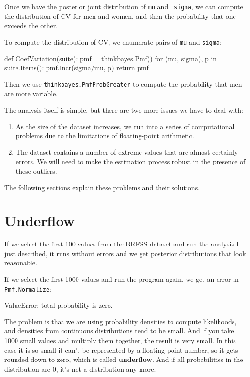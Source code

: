 \documentclass[12pt]{book}
\theoremstyle{exercise}
\begin{document}
Once we have the posterior joint distribution of {\tt mu} and {\tt
  sigma}, we can compute the distribution of CV for men and women, and
then the probability that one exceeds the other.

To compute the distribution of CV, we enumerate pairs of
{\tt mu} and {\tt sigma}:

\begin{code}
def CoefVariation(suite):
    pmf = thinkbayes.Pmf()
    for (mu, sigma), p in suite.Items():
        pmf.Incr(sigma/mu, p)
    return pmf
\end{code}

Then we use \verb"thinkbayes.PmfProbGreater" to compute the
probability that men are more variable.

The analysis itself is simple, but there are two more issues we
have to deal with:

\begin{enumerate}

\item As the size of the dataset increases, we run into a series of
  computational problems due to the limitations of floating-point
  arithmetic.

\item The dataset contains a number of extreme values that are almost
  certainly errors.  We will need to make the estimation process
  robust in the presence of these outliers.

\end{enumerate}

The following sections explain these problems and their solutions.


\section{Underflow}
\label{underflow}

If we select the first 100 values from the BRFSS dataset and run the
analysis I just described, it runs without errors and we get posterior
distributions that look reasonable.

If we select the first 1000 values and run the program again, we get
an error in \verb"Pmf.Normalize":

\begin{code}
ValueError: total probability is zero.
\end{code}

The problem is that we are using probability densities to compute
likelihoods, and densities from continuous distributions tend to be
small.  And if you take 1000 small values and multiply
them together, the result is very small.  In this case it is so small
it can't be represented by a floating-point number, so it gets rounded
down to zero, which is called {\bf underflow}.  And if all
probabilities in the distribution are 0, it's not a distribution any
more.
\end{document}

